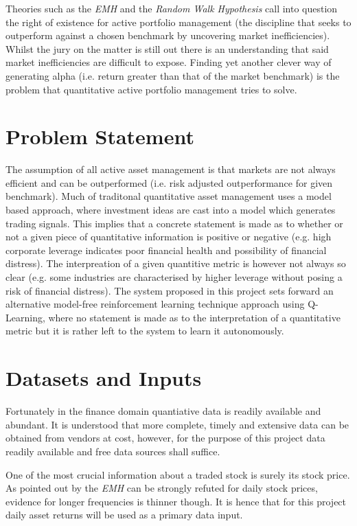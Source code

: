 \documentclass[dvips,12pt]{article}
\begin{document}
Theories such as the \emph{EMH} and the \emph{Random Walk Hypothesis}\cite{cootner1964} call into question the right of existence for active portfolio management (the discipline that seeks to outperform against a chosen benchmark by uncovering market inefficiencies). Whilst the jury on the matter is still out there is an understanding that said market inefficiencies are difficult to expose\cite{grinoldkahn1999}. Finding yet another clever way of generating alpha (i.e. return greater than that of the market benchmark) is the problem that quantitative active portfolio management tries to solve.


\section{Problem Statement}
The assumption of all active asset management is that markets are not always efficient and can be outperformed (i.e. risk adjusted outperformance for given benchmark). Much of traditonal quantitative asset management uses a model based approach, where investment ideas are cast into a model which generates trading signals\cite{grinoldkahn1999}. This implies that a concrete statement is made as to whether or not a given piece of quantitative information is positive or negative (e.g. high corporate leverage indicates poor financial health and possibility of financial distress). The interpreation of a given quantitive metric is however not always so clear (e.g. some industries are characterised by higher leverage without posing a risk of financial distress). The system proposed in this project sets forward an alternative model-free reinforcement learning technique approach using Q-Learning, where no statement is made as to the interpretation of a quantitative metric but it is rather left to the system to learn it autonomously.

\section{Datasets and Inputs}
Fortunately in the finance domain quantiative data is readily available and abundant. It is understood that more complete, timely and extensive data can be obtained from vendors at cost, however, for the purpose of this project data readily available and free data sources shall suffice.

One of the most crucial information about a traded stock is surely its stock price. As pointed out by \cite{sewell2012} the \emph{EMH} can be strongly refuted for daily stock prices, evidence for longer frequencies is thinner though. It is hence that for this project daily asset returns will be used as a primary data input.
\end{document}
